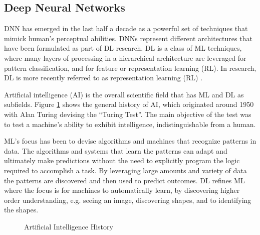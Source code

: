 \documentclass[11pt]{article}
\begin{document}
\subsection{Deep Neural Networks} \label{sec:dnn}
DNN has emerged in the last half a decade as a powerful set of techniques that mimick human's perceptual abilities. DNNs represent different architectures that have been formulated as part of DL research. DL is a class of ML techniques, where many layers of processing in a hierarchical architecture are leveraged for pattern classification, and for feature or representation learning (RL). In research, DL is more recently referred to as representation learning (RL) \citet{Bengio2013RepresentationPerspectives, MAL-006}.

Artificial intelligence (AI) is the overall scientific field that has ML and DL as subfields. Figure \ref{fig:ml-history} shows the general history of AI, which originated around 1950 with Alan Turing \cite{Alan1950Turing.Intelligence} devising the ``Turing Test''. The main objective of the test was to test a machine’s ability to exhibit intelligence, indistinguishable from a human.

ML’s focus has been to devise algorithms and machines that recognize patterns in data. The algorithms and systems that learn the patterns can adapt and ultimately make predictions without the need to explicitly program the logic required to accomplish a task. By leveraging large amounts and variety of data the patterns are discovered and then used to predict outcomes. DL refines ML where the focus is for machines to automatically learn, by discovering higher order understanding, e.g. seeing an image, discovering shapes, and to identifying the shapes.

\begin{figure}[!ht]
	\centering
	\caption{Artificial Intelligence History}
	\label{fig:ml-history}
\end{figure}
\end{document}
